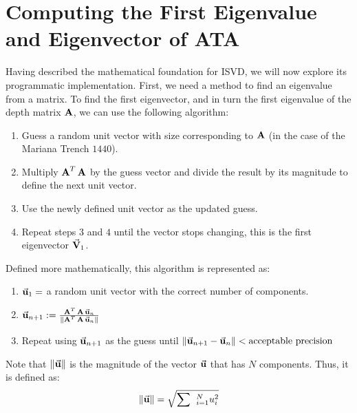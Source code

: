 
\section{Computing the First Eigenvalue and Eigenvector of ATA} \label{sec:firstEigen}
Having described the mathematical foundation for ISVD, we will now explore its programmatic implementation. First, we need a method to find an eigenvalue from a matrix. To find the first eigenvector, and in turn the first eigenvalue of the depth matrix $\operatorname{\mathbf{A}}$, we can use the following algorithm:
\begin{center}
\begin{enumerate}
    \item Guess a random unit vector with size corresponding to $\operatorname{\mathbf{A}}$ (in the case of the Mariana Trench $1440$).
    \item Multiply $\operatorname{\mathbf{A}}^T\operatorname{\mathbf{A}}$ by the guess vector and divide the result by its magnitude to define the next unit vector.
    \item Use the newly defined unit vector as the updated guess.
    \item Repeat steps $3$ and $4$ until the vector stops changing, this is the first eigenvector $\vec{\mathbf{V}}_1$.
\end{enumerate}
\end{center}
Defined more mathematically, this algorithm is represented as:
\begin{enumerate}
    \item $\vec{\mathbf{u}}_1 = $  a random unit vector with the correct number of components.
    \item $\vec{\mathbf{u}}_{n+1} := \frac{\operatorname{\mathbf{A}}^T\operatorname{\mathbf{A}}\vec{\mathbf{u}}_{n}}{\lVert \operatorname{\mathbf{A}}^T\operatorname{\mathbf{A}}\vec{\mathbf{u}}_{n} \rVert}$
    \item Repeat using $\vec{\mathbf{u}}_{n+1}$ as the guess until $\lVert \vec{\mathbf{u}}_{n+1} -  \vec{\mathbf{u}}_{n} \rVert < \text{acceptable precision}$
\end{enumerate}
Note that $\lVert \vec{\mathbf{u}} \rVert$ is the magnitude of the vector $\vec{\mathbf{u}}$ that has $N$ components. Thus, it is defined as:
\begin{align*}
    \lVert\vec{\mathbf{u}}\rVert=\sqrt{\sum \:\:_{i=1}^Nu_i^2}
\end{align*}

